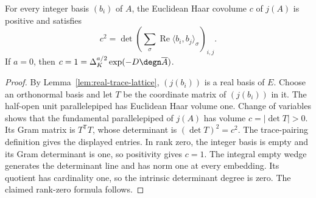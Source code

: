 \begin{lemma}
\label{lem:trace-covolume-gram}
\leanok
For every integer basis $(b_i)$ of $A$, the Euclidean Haar covolume $c$ of
$j(A)$ is positive and satisfies
\[
 c^2=\det\left(\sum_\sigma
   \operatorname{Re}\langle b_i,b_j\rangle_\sigma\right)_{i,j}.
\]
If $a=0$, then $c=1=\Delta_K^{a/2}\exp(-D\degn\overline A)$.
\end{lemma}
\begin{proof}
By Lemma~\ref{lem:real-trace-lattice}, $(j(b_i))$ is a real basis of $E$.
Choose an orthonormal basis and let $T$ be the coordinate matrix of
$(j(b_i))$ in it. The half-open unit parallelepiped has Euclidean Haar
volume one. Change of variables shows that the fundamental
parallelepiped of $j(A)$ has volume $c=|\det T|>0$. Its Gram matrix is
$T^{\mathsf T}T$, whose determinant is $(\det T)^2=c^2$.
The trace-pairing definition gives the displayed entries. In rank zero,
the integer basis is empty and its Gram determinant is one, so positivity
gives $c=1$. The integral empty wedge generates the determinant line and
has norm one at every embedding. Its quotient has cardinality one, so
the intrinsic determinant degree is zero. The claimed rank-zero formula
follows.
\end{proof}

